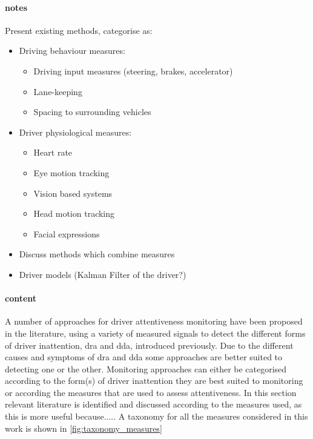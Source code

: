 \documentclass[11pt, parskip=half*,twoside=false]{scrbook}
\begin{document}
\paragraph{notes}
Present existing methods, categorise as:
\begin{itemize}
	\item Driving behaviour measures:
	\begin{itemize}
		\item Driving input measures (steering, brakes, accelerator)
		\item Lane-keeping
		\item Spacing to surrounding vehicles
	\end{itemize}
	\item Driver physiological measures:
	\begin{itemize}
		\item Heart rate
		\item Eye motion tracking
		\item Vision based systems
		\item Head motion tracking
		\item Facial expressions
	\end{itemize}
	\item Discuss methods which combine measures
	\item Driver models (Kalman Filter of the driver?)
\end{itemize}


\paragraph{content}


A number of approaches for driver attentiveness monitoring have been proposed in the literature, using a variety of measured signals to detect the different forms of driver inattention, \gls{dra} and \gls{dda}, introduced previously. Due to the different causes and symptoms of \gls{dra} and \gls{dda} some approaches are better suited to detecting one or the other. Monitoring approaches can either be categorised according to the form(s) of driver inattention they are best suited to monitoring or according the measures that are used to assess attentiveness. In this section relevant literature is identified and discussed according to the measures used, as this is more useful because..... A taxonomy for all the measures considered in this work is shown in \cref{fig:taxonomy_measures}
\end{document}
